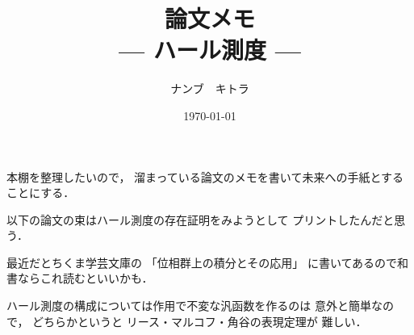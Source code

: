 \documentclass[leqno, a4paper, 12pt]{jsarticle}
\title{論文メモ
\large{\\--- ハール測度 ---}
}
\author{ナンブ　キトラ}
\date{\today}
\begin{document}
\maketitle

本棚を整理したいので，
溜まっている論文のメモを書いて未来への手紙とすることにする．


以下の論文の束はハール測度の存在証明をみようとして
プリントしたんだと思う．

最近だとちくま学芸文庫の
「位相群上の積分とその応用」
に書いてあるので和書ならこれ読むといいかも．

ハール測度の構成については作用で不変な汎函数を作るのは
意外と簡単なので，
どちらかというと
リース・マルコフ・角谷の表現定理が
難しい．

\nocite{*}


\end{document}
